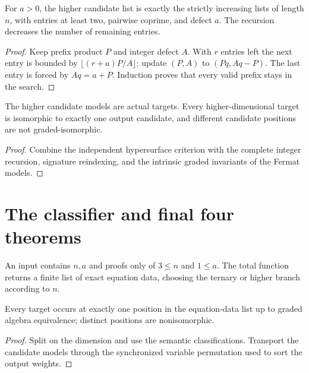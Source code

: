 \begin{theorem}
\label{thm:higher-enum}
\leanok
For $a>0$, the higher candidate list is exactly the strictly increasing lists of length $n$, with entries at least two, pairwise coprime, and defect $a$. The recursion decreases the number of remaining entries.
\end{theorem}
\begin{proof}
\leanok
{}
Keep prefix product $P$ and integer defect $A$. With $r$ entries left the next entry is bounded by $\lfloor(r+a)P/A\rfloor$; update $(P,A)$ to $(Pq,Aq-P)$. The last entry is forced by $Aq=a+P$. Induction proves that every valid prefix stays in the search.
\end{proof}

\begin{theorem}
\label{thm:higher-model}
\leanok
The higher candidate models are actual targets. Every higher-dimensional target is isomorphic to exactly one output candidate, and different candidate positions are not graded-isomorphic.
\end{theorem}
\begin{proof}
\leanok
{}
Combine the independent hypersurface criterion with the complete integer recursion, signature reindexing, and the intrinsic graded invariants of the Fermat models.
\end{proof}

\section{The classifier and final four theorems}

\begin{definition}
\label{def:enumerate}
\leanok
{}
An input contains $n,a$ and proofs only of $3\leq n$ and $1\leq a$. The total function returns a finite list of exact equation data, choosing the ternary or higher branch according to $n$.
\end{definition}

\begin{theorem}
\label{thm:output}
\leanok
Every target occurs at exactly one position in the equation-data list up to graded algebra equivalence; distinct positions are nonisomorphic.
\end{theorem}
\begin{proof}
\leanok
{}
Split on the dimension and use the semantic classifications. Transport the candidate models through the synchronized variable permutation used to sort the output weights.
\end{proof}

